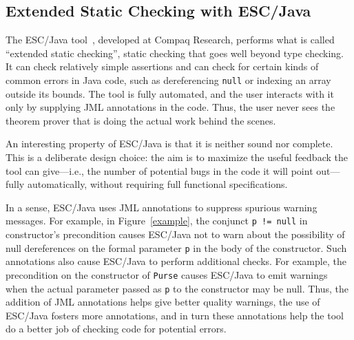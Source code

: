 \documentclass{entcs}
\begin{document}
%
%

\subsection{Extended Static Checking with ESC/Java}
\label{escjava}

The ESC/Java tool~\cite{Flanagan-Et-Al02}, developed at Compaq
Research, performs what is called ``extended static checking'', static
checking that goes well beyond type checking.  It can check relatively
simple assertions and can check for certain kinds of common errors in
Java code, such as dereferencing \texttt{null} or indexing an array
outside its bounds.  The tool is fully automated, and the user
interacts with it only by supplying JML annotations in the code.
Thus, the user never sees the theorem prover that is doing the actual
work behind the scenes.

An interesting property of ESC/Java is that it is neither sound nor
complete.  This is a deliberate design choice: the aim is to maximize
the useful feedback the tool can give---i.e., the number of potential
bugs in the code it will point out---fully automatically, without
requiring full functional specifications.

In a sense, ESC/Java uses JML annotations to suppress spurious warning
messages. For example, in Figure~\ref{example},
the conjunct \texttt{p != null} in constructor's precondition causes
ESC/Java not to warn about the possibility of null dereferences on the
formal parameter \texttt{p} in the body of the constructor.
Such annotations also cause ESC/Java to perform additional checks. For
example, the precondition on the constructor of \texttt{Purse} causes
ESC/Java to emit warnings
when the actual parameter passed as \texttt{p} to the
constructor may be null.
Thus, the addition of JML annotations helps give better quality
warnings, the use of ESC/Java fosters more annotations, and in turn
these annotations help the tool do a better job of checking code for
potential errors.
\end{document}
